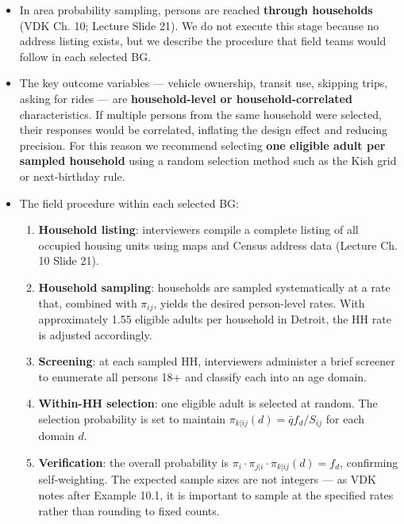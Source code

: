 \documentclass[
  11pt,
]{article}
\providecommand{\tightlist}{%
  \setlength{\itemsep}{0pt}\setlength{\parskip}{0pt}}\usepackage{longtable,booktabs,array}
\begin{document}
\begin{itemize}
\item
  In area probability sampling, persons are reached \textbf{through
  households} (VDK Ch. 10; Lecture Slide 21). We do not execute this
  stage because no address listing exists, but we describe the procedure
  that field teams would follow in each selected BG.
\item
  The key outcome variables --- vehicle ownership, transit use, skipping
  trips, asking for rides --- are \textbf{household-level or
  household-correlated} characteristics. If multiple persons from the
  same household were selected, their responses would be correlated,
  inflating the design effect and reducing precision. For this reason we
  recommend selecting \textbf{one eligible adult per sampled household}
  using a random selection method such as the Kish grid or next-birthday
  rule.
\item
  The field procedure within each selected BG:

  \begin{enumerate}
  \def\labelenumi{\arabic{enumi}.}
  \tightlist
  \item
    \textbf{Household listing}: interviewers compile a complete listing
    of all occupied housing units using maps and Census address data
    (Lecture Ch. 10 Slide 21).
  \item
    \textbf{Household sampling}: households are sampled systematically
    at a rate that, combined with \(\pi_{ij}\), yields the desired
    person-level rates. With approximately 1.55 eligible adults per
    household in Detroit, the HH rate is adjusted accordingly.
  \item
    \textbf{Screening}: at each sampled HH, interviewers administer a
    brief screener to enumerate all persons 18+ and classify each into
    an age domain.
  \item
    \textbf{Within-HH selection}: one eligible adult is selected at
    random. The selection probability is set to maintain
    \(\pi_{k|ij}(d) = \bar{q} f_d / S_{ij}\) for each domain \(d\).
  \item
    \textbf{Verification}: the overall probability is
    \(\pi_i \cdot \pi_{j|i} \cdot \pi_{k|ij}(d) = f_d\), confirming
    self-weighting. The expected sample sizes are not integers --- as
    VDK notes after Example 10.1, it is important to sample at the
    specified rates rather than rounding to fixed counts.
  \end{enumerate}
\end{itemize}
\end{document}
